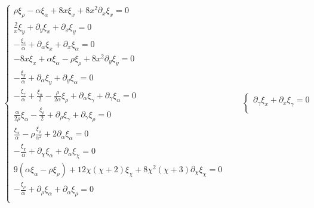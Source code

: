 \begin{equation*}
    \begin{aligned}
        \begin{cases}
          \displaystyle \rho \xi_{\rho} - \alpha \xi_{\alpha}+ 8x\xi_x + 8x^2\partial_x\xi_{x} = 0 \\[0.5em]
          
          \displaystyle \frac{2}{x}\xi_y + \partial_y\xi_x + \partial_x\xi_y = 0 \\[0.5em]
          
          \displaystyle -\frac{\xi_x}{\alpha}+\partial_{\alpha}\xi_x + \partial_x\xi_{\alpha} =0 \\[0.5em]
          
          \displaystyle -8x\xi_x + \alpha\xi_{\alpha} -\rho \xi_{\rho} + 8x^2 \partial_y\xi_y =0\\[0.5em]
          
          \displaystyle -\frac{\xi_y}{\alpha} + \partial_{\alpha}\xi_y + \partial_y\xi_{\alpha} =0 \\[0.5em]

          \displaystyle - \frac{\xi_{\gamma}}{\alpha} + \frac{\xi_{\alpha}}{2} - \frac{\rho}{2\alpha}\xi_{\rho} + \partial_{\alpha}\xi_{\gamma} + \partial_{\gamma} \xi_{\alpha}=0\\[0.5em]

          \displaystyle \frac{\alpha}{2 \rho}\xi_{\alpha}-\frac{\xi_{\rho}}{2} + \partial_{\rho}\xi_{\gamma}+ \partial_{\gamma}\xi_{\rho}=0 \\[0.5em]

          \displaystyle \frac{\xi_{\alpha}}{\alpha} -\rho\frac{\xi_{\rho}}{\alpha^2} +2\partial_{\alpha}\xi_{\alpha}=0 \\[0.5em]

          \displaystyle -\frac{\xi_{\chi}}{\alpha} + \partial_{\chi}\xi_{\alpha}+ \partial_{\alpha}\xi_{\chi}=0 \\[0.5em]

          \displaystyle 9(\alpha\xi_{\alpha} - \rho\xi_{\rho}) + 12\chi(\chi+2)\xi_{\chi} + 8\chi^2(\chi+3)\partial_{\chi}\xi_{\chi}=0 \\[0.5em]

          \displaystyle -\frac{\xi_{\rho}}{\alpha}+ \partial_{\rho}\xi_\alpha + \partial_{\alpha}\xi_{\rho}=0 \\[0.5em]
          
        \end{cases}
        \qquad
        \begin{cases}
          \displaystyle \partial_{\gamma}\xi_x + \partial_x\xi_{\gamma}=0 \\[0.5em]


\end{cases}
\end{aligned}
\end{equation*}
